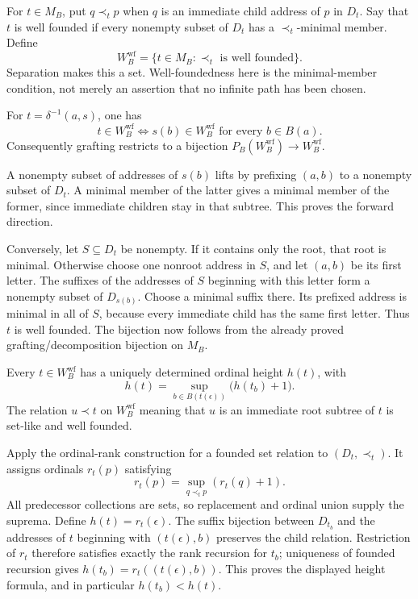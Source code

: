 \begin{definition}
For $t\in M_B$, put $q\prec_t p$ when $q$ is an immediate child address
of $p$ in $D_t$. Say that $t$ is well founded if every nonempty subset
of $D_t$ has a $\prec_t$-minimal member. Define
\[
W_B^{\mathrm{wf}}=\{t\in M_B:\prec_t\text{ is well founded}\}.
\]
Separation makes this a set. Well-foundedness here is the minimal-member
condition, not merely an assertion that no infinite path has been chosen.
\end{definition}

\begin{lemma}
For $t=\delta^{-1}(a,s)$, one has
\[
t\in W_B^{\mathrm{wf}}
\iff s(b)\in W_B^{\mathrm{wf}}\text{ for every }b\in B(a).
\]
Consequently grafting restricts to a bijection
$P_B(W_B^{\mathrm{wf}})\to W_B^{\mathrm{wf}}$.
\end{lemma}
\Proof
A nonempty subset of addresses of $s(b)$ lifts by prefixing $(a,b)$
to a nonempty subset of $D_t$. A minimal member of the latter gives a
minimal member of the former, since immediate children stay in that
subtree. This proves the forward direction.

Conversely, let $S\subseteq D_t$ be nonempty. If it contains only the
root, that root is minimal. Otherwise choose one nonroot address in
$S$, and let $(a,b)$ be its first letter. The suffixes of the addresses
of $S$ beginning with this letter form a nonempty subset of $D_{s(b)}$.
Choose a minimal suffix there. Its prefixed address is minimal in all
of $S$, because every immediate child has the same first letter.
Thus $t$ is well founded. The bijection now follows from the already
proved grafting/decomposition bijection on $M_B$.
\Done

\begin{lemma}
Every $t\in W_B^{\mathrm{wf}}$ has a uniquely determined ordinal height
$h(t)$, with
\[
h(t)=\sup_{b\in B(t(\epsilon))}\bigl(h(t_b)+1\bigr).
\]
The relation $u\prec t$ on $W_B^{\mathrm{wf}}$ meaning that $u$ is an
immediate root subtree of $t$ is set-like and well founded.
\end{lemma}
\Proof
Apply the ordinal-rank construction for a founded set relation to
$(D_t,\prec_t)$. It assigns ordinals $r_t(p)$ satisfying
\[
r_t(p)=\sup_{q\prec_t p}(r_t(q)+1).
\]
All predecessor collections are sets, so replacement and ordinal union
supply the suprema. Define $h(t)=r_t(\epsilon)$. The suffix bijection
between $D_{t_b}$ and the addresses of $t$ beginning with
$(t(\epsilon),b)$ preserves the child relation. Restriction of $r_t$
therefore satisfies exactly the rank recursion for $t_b$; uniqueness
of founded recursion gives
$h(t_b)=r_t((t(\epsilon),b))$. This proves the displayed height formula,
and in particular $h(t_b)<h(t)$.

